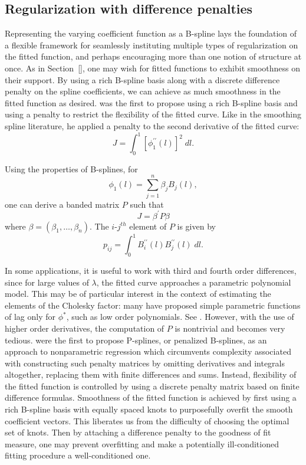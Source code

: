 \documentclass[12pt]{article}
\theoremstyle{definition}
\begin{document}
\subsection{Regularization with difference penalties} \label{subsection:univariate-psplines}

Representing the varying coefficient function as a B-spline lays the foundation of a flexible framework for seamlessly instituting multiple types of regularization on the fitted function, and perhaps encouraging more than one notion of structure at once. As in Section~\ref{}, one may wish for fitted functions to exhibit smoothness on their support. By using a rich B-spline basis along with a discrete difference penalty on the spline coefficients, we can achieve as much smoothness in the fitted function as desired. \cite{o1986statistical} was the first to propose using a rich B-spline basis and using a penalty to restrict the flexibility of the fitted curve. Like \citet{wahba1990spline} in the smoothing spline literature, he applied a penalty to the second derivative of the fitted curve:
\[
J = \int_0^1 \left[ \phi_1^{\prime \prime}\left(l\right)\right]^2\;dl.
\]

Using the properties of B-splines, for 
\[
\phi_1\left(l\right) = \sum\limits_{j=1}^n \beta_j B_j\left(l\right),
\]
one can derive a banded matrix $P$ such that 
 \[
 J = \beta^\prime P \beta
 \] 
 \noindent
 where $\beta = \left(\beta_1,\dots, \beta_n\right)$. The $i$-$j^{th}$ element of $P$ is given by
 \[
 p_{ij} = \int_0^1 B_i^{\prime \prime} \left( l \right)B_j^{\prime \prime} \left( l \right)\;dl.
 \]

In some applications, it is useful to work with third and fourth order differences, since for large values of $\lambda$, the fitted curve approaches a parametric polynomial model. This may be of particular interest in the context of estimating the elements of the Cholesky factor: many have proposed simple parametric functions of lag only for $\phi^*$, such as low order polynomials. See \citet{pourahmadi1999joint}. However, with the use of higher order derivatives, the computation of $P$ is nontrivial and becomes very tedious. \citet{eilers1996flexible} were the first to propose P-splines, or penalized B-splines, as an approach to nonparametric regression which circumvents complexity associated with constructing such penalty matrices by omitting derivatives and integrals altogether, replacing them with finite differences and sums. Instead, flexibility of the fitted function is controlled by using a discrete penalty matrix based on finite difference formulas. Smoothness of the fitted function is achieved by first using a rich B-spline basis with equally spaced knots to purposefully overfit the smooth coefficient vectors. This liberates us from the difficulty of choosing the optimal set of knots. Then by attaching a difference penalty to the goodness of fit measure, one may prevent overfitting and make a potentially ill-conditioned fitting procedure a well-conditioned one. 
\end{document}
